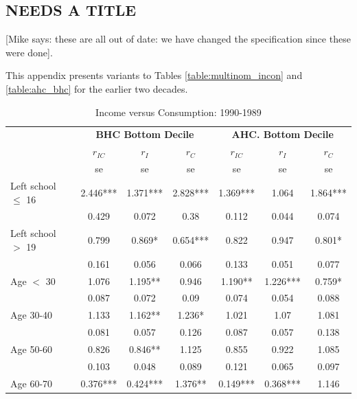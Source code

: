 \subsection{NEEDS A TITLE}

[Mike says: these are all out of date: we have changed the specification since these were done].

This appendix presents variants to Tables \ref{table:multinom_incon} and \ref{table:ahc_bhc} for the earlier two decades.


\begin{table}
\caption{Income versus Consumption: 1990-1989}
\centering
\begin{tabular}{l|ccc|ccc}
\hline\hline 
	& \multicolumn{3}{c}{\textbf{BHC Bottom Decile}} &  \multicolumn{3}{c}{\textbf{AHC. Bottom Decile}} \\
	&	$r_{IC}$	&	$r_{I}$	&	$r_{C}$	&	$r_{IC}$	&	$r_{I}$	&	$r_{C}$	\\
  & se & se & se  & se & se & se \\
\hline
Left school $\leq$ 16	&	       2.446***	&	       1.371***	&	       2.828***	&	       1.369***	&	1.064	&	       1.864***	\\				
                    	&	       0.429   	&	0.072	&	0.38	&	       0.112   	&	0.044	&	0.074	\\				
Left school $>$ 19	&	       0.799   	&	       0.869*  	&	       0.654***	&	       0.822   	&	0.947	&	       0.801*  	\\				
                    	&	       0.161   	&	0.056	&	0.066	&	       0.133   	&	0.051	&	0.077	\\				
Age $<$ 30	&	       1.076   	&	       1.195** 	&	0.946	&	       1.190** 	&	       1.226***	&	       0.759*  	\\				
                    	&	       0.087   	&	0.072	&	0.09	&	       0.074   	&	0.054	&	0.088	\\				
Age 30-40	&	       1.133   	&	       1.162** 	&	       1.236*  	&	       1.021   	&	1.07	&	1.081	\\				
                    	&	       0.081   	&	0.057	&	0.126	&	       0.087   	&	0.057	&	0.138	\\				
Age 50-60	&	       0.826   	&	       0.846** 	&	1.125	&	       0.855   	&	0.922	&	1.085	\\				
                    	&	       0.103   	&	0.048	&	0.089	&	       0.121   	&	0.065	&	0.097	\\				
Age 60-70	&	       0.376***	&	       0.424***	&	       1.376** 	&	       0.149***	&	       0.368***	&	1.146	\\				

\end{tabular}
\end{table}
